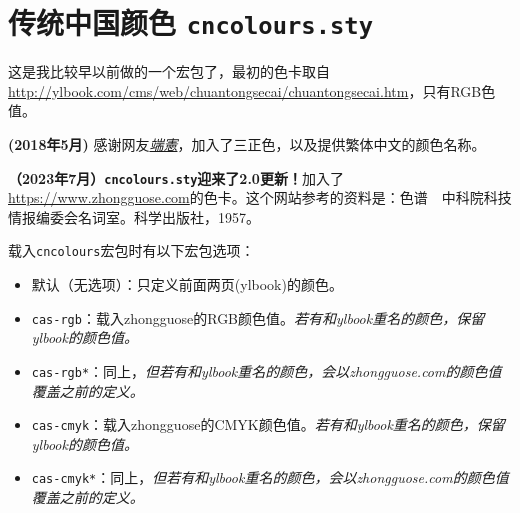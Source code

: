 \documentclass[fontset=fandol]{ctexart}
\begin{document}
\clearpage
\appendix
\setlength{\parindent}{2\ccwd}\justifying
{}
\label{appendix-start}

\section{传统中国颜色 \texttt{cncolours.sty}}
\label{app:cncolours}

\begingroup


这是我比较早以前做的一个宏包了，最初的色卡取自 \url{http://ylbook.com/cms/web/chuantongsecai/chuantongsecai.htm}，只有RGB色值。

 \textbf{(2018年5月)} 感谢网友\href{https://github.com/heangfat}{\emph{端憲}}，加入了三正色，以及提供繁体中文的颜色名称。

\medskip

\textbf{（2023年7月）\texttt{cncolours.sty}迎来了2.0更新！}加入了\url{https://www.zhongguose.com}的色卡。这个网站参考的资料是：色谱　中科院科技情报编委会名词室。科学出版社，1957。

载入\texttt{cncolours}宏包时有以下宏包选项：
\begin{itemize}[noitemsep]
  \item 默认（无选项）：只定义前面两页(ylbook)的颜色。
  \item \texttt{cas-rgb}：载入zhongguose的RGB颜色值。\emph{若有和ylbook重名的颜色，保留ylbook的颜色值。}
  \item \texttt{cas-rgb*}：同上，\emph{但若有和ylbook重名的颜色，会以zhongguose.com的颜色值覆盖之前的定义。}
  \item \texttt{cas-cmyk}：载入zhongguose的CMYK颜色值。\emph{若有和ylbook重名的颜色，保留ylbook的颜色值。}
  \item \texttt{cas-cmyk*}：同上，\emph{但若有和ylbook重名的颜色，会以zhongguose.com的颜色值覆盖之前的定义。}
\end{itemize}


\bigskip

\renewcommand{\baselinestretch}{2}
\newcommand\showcolour[1]{%
  \fcolorbox{乌黑}{#1}{\makebox[2em]{\phantom{M}}}~\makebox[5em][l]{#1}%
}
\end{document}
